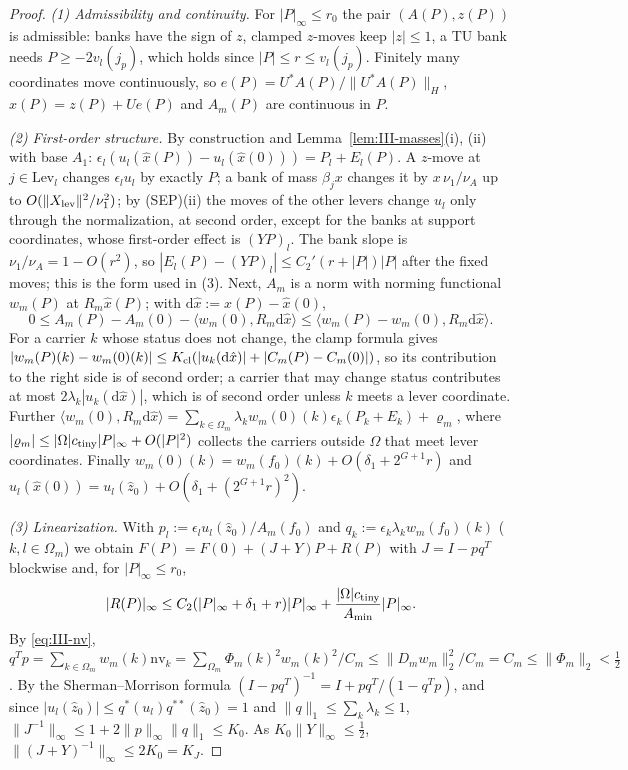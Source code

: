 \documentclass[10pt]{amsart}
\theoremstyle{definition}
\theoremstyle{remark}
\newcommand{\zh}{\hat z}
\newcommand{\ip}[2]{\langle #1,#2\rangle}
\begin{document}
\begin{proof}
\emph{(1) Admissibility and continuity.}  For $|P|_\infty\le r_0$ the pair
$(A(P),z(P))$ is admissible: banks have the sign of $z$, clamped $z$-moves keep
$|z|\le1$, a TU bank needs $P\ge-2v_l(j_p)$, which holds since $|P|\le r\le
v_l(j_p)$.  Finitely many coordinates move continuously, so $e(P)=U^*A(P)/
\|U^*A(P)\|_H$, $\hat x(P)=z(P)+Ue(P)$ and $A_m(P)$ are continuous in $P$.

\emph{(2) First-order structure.}  By construction and
Lemma~\ref{lem:III-masses}(i), (ii) with base $A_1$:
$\epsilon_l(u_l(\hat x(P))-u_l(\hat x(0)))=P_l+E_l(P)$.  A $z$-move at $j\in
\mathrm{Lev}_l$ changes $\epsilon_lu_l$ by exactly $P$; a bank of mass
$\beta_jx$ changes it by $x\,\nu_1/\nu_A$ up to $O(\|X_{\rm lev}\|^2/\nu_1^2)$;
by (SEP)(ii) the moves of the other levers change $u_l$ only through the
normalization, at second order, except for the banks at support coordinates,
whose first-order effect is $(YP)_l$.  The bank slope is $\nu_1/\nu_A=1-O(r^2)$,
so $|E_l(P)-(YP)_l|\le C_2'(r+|P|)|P|$ after the fixed moves; this is the form
used in (3).  Next, $A_m$ is a norm with norming functional $w_m(P)$ at
$R_m\hat x(P)$; with $\mathrm d\hat x:=\hat x(P)-\hat x(0)$,
\[
 0\le A_m(P)-A_m(0)-\ip{w_m(0)}{R_m\mathrm d\hat x}\le
 \ip{w_m(P)-w_m(0)}{R_m\mathrm d\hat x}.
\]
For a carrier $k$ whose status does not change, the clamp formula gives
$|w_m(P)(k)-w_m(0)(k)|\le K_{\rm cl}(|u_k(\mathrm d\hat x)|+|C_m(P)-C_m(0)|)$, so
its contribution to the right side is of second order; a carrier that may
change status contributes at most $2\lambda_k|u_k(\mathrm d\hat x)|$, which is
of second order unless $k$ meets a lever coordinate.  Further
$\ip{w_m(0)}{R_m\mathrm d\hat x}=\sum_{k\in\Omega_m}\lambda_kw_m(0)(k)
\epsilon_k(P_k+E_k)+\varrho_m$, where $|\varrho_m|\le|\Omega|c_{\rm tiny}|P|_\infty+
O(|P|^2)$ collects the carriers outside $\Omega$ that meet lever coordinates.
Finally $w_m(0)(k)=w_m(f_0)(k)+O(\delta_1+2^{G+1}r)$ and $u_l(\hat x(0))=
u_l(\zh_0)+O(\delta_1+(2^{G+1}r)^2)$.

\emph{(3) Linearization.}  With $p_l:=\epsilon_lu_l(\zh_0)/A_m(f_0)$ and
$q_k:=\epsilon_k\lambda_kw_m(f_0)(k)$ ($k,l\in\Omega_m$) we obtain
$F(P)=F(0)+(J+Y)P+R(P)$ with $J=I-pq^T$ blockwise and, for $|P|_\infty\le r_0$,
\[
 |R(P)|_\infty\le C_2(|P|_\infty+\delta_1+r)|P|_\infty+\frac{|\Omega|c_{\rm tiny}}
 {A_{\min}}|P|_\infty .
\]
By \eqref{eq:III-nv}, $q^Tp=\sum_{k\in\Omega_m}w_m(k)\mathrm{nv}_k=\sum_{\Omega_m}
\Phi_m(k)^2w_m(k)^2/C_m\le\|D_mw_m\|_2^2/C_m=C_m\le\|\Phi_m\|_2<\frac12$.  By the
Sherman--Morrison formula $(I-pq^T)^{-1}=I+pq^T/(1-q^Tp)$, and since
$|u_l(\zh_0)|\le q^*(u_l)q^{**}(\zh_0)=1$ and $\|q\|_1\le\sum_k\lambda_k\le1$,
$\|J^{-1}\|_\infty\le1+2\|p\|_\infty\|q\|_1\le K_0$.  As $K_0\|Y\|_\infty\le\frac12$,
$\|(J+Y)^{-1}\|_\infty\le2K_0=K_J$.


\end{proof}
\end{document}
